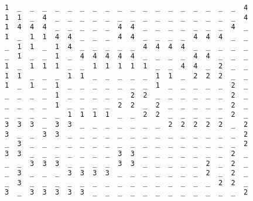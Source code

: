 \documentclass{report}
\begin{document}
{{\begin{lstlisting}
1  _  _  _  _  _  _  _  _  _  _  _  _  _  _  _  _  _  _  4
1  1  _  4  _  _  _  _  _  _  _  _  _  _  _  _  _  _  _  4
1  4  4  4  _  _  _  _  _  4  4  _  _  _  _  _  _  _  4  _
1  _  1  1  4  4  _  _  _  4  4  _  _  _  _  4  4  4  _  _
_  1  1  _  1  4  _  _  _  _  _  4  4  4  4  _  _  _  _  _
_  1  _  _  1  _  4  4  4  4  4  _  _  _  _  4  4  _  _  _
1  _  1  1  1  _  _  1  1  1  1  1  _  _  4  4  _  2  _  _
1  1  _  _  _  1  1  _  _  _  _  _  1  1  _  2  2  2  _  _
1  _  1  _  1  _  _  _  _  _  _  _  1  _  _  _  _  _  2  _
_  _  _  _  1  _  _  _  _  _  2  2  _  _  _  _  _  _  2  _
_  _  _  _  1  _  _  _  _  2  2  _  2  _  _  _  _  _  2  _
_  _  _  _  _  1  1  1  1  _  _  2  2  _  _  _  _  _  2  _
3  3  3  _  3  3  _  _  _  _  _  _  _  2  2  2  2  2  _  2
3  _  _  3  3  _  _  _  _  _  _  _  _  _  _  _  _  _  _  2
_  3  _  _  _  _  _  _  _  _  _  _  _  _  _  _  _  _  _  2
3  3  _  _  _  _  _  _  _  3  3  _  _  _  _  _  _  _  2  _
_  _  3  3  3  _  _  _  _  3  3  _  _  _  _  _  2  _  2  _
_  3  _  _  _  3  3  3  3  _  _  _  _  _  _  _  2  _  2  _
_  3  _  _  _  _  _  _  _  _  _  _  _  _  _  _  _  2  2  _
3  _  3  3  3  3  3  _  _  _  _  _  _  _  _  _  _  _  _  2


\end{lstlisting}}}
\end{document}
